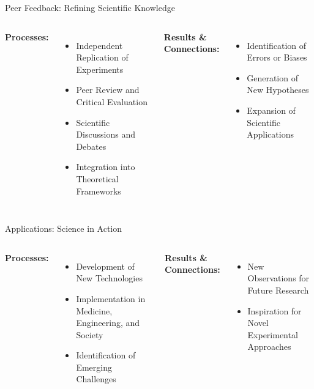\begin{frame}{Peer Feedback: Refining Scientific Knowledge}
  \begin{columns}
    \textbf{Processes:}
    \begin{itemize}
      \item Independent Replication of Experiments
      \item Peer Review and Critical Evaluation
      \item Scientific Discussions and Debates
      \item Integration into Theoretical Frameworks
    \end{itemize}

    \textbf{Results \& Connections:}
    \begin{itemize}
      \item Identification of Errors or Biases
      \item Generation of New Hypotheses
      \item Expansion of Scientific Applications
      \vspace{1.1cm}
    \end{itemize}
  \end{columns}
\end{frame}

\begin{frame}{Applications: Science in Action}
  \begin{columns}
    \textbf{Processes:}
    \begin{itemize}
      \item Development of New Technologies
      \item Implementation in Medicine, Engineering, and Society
      \item Identification of Emerging Challenges
    \end{itemize}

    \textbf{Results \& Connections:}
    \begin{itemize}
      \item New Observations for Future Research
      \item Inspiration for Novel Experimental Approaches
      \vspace{1.1cm}
    \end{itemize}
  \end{columns}
\end{frame}
